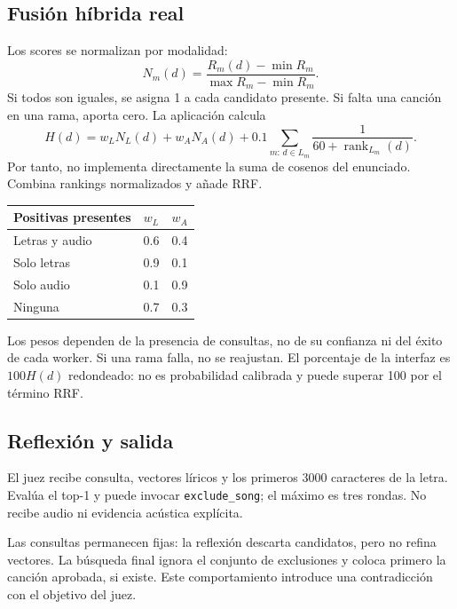 \documentclass[11pt,a4paper]{article}
\newcommand{\code}[1]{\nolinkurl{#1}}
\begin{document}
\subsection{Fusión híbrida real}
Los scores se normalizan por modalidad:
\[
N_m(d)=\frac{R_m(d)-\min R_m}{\max R_m-\min R_m}.
\]
Si todos son iguales, se asigna 1 a cada candidato presente. Si falta una canción en una rama, aporta cero. La aplicación calcula
\[
H(d)=w_LN_L(d)+w_AN_A(d)
+0.1\sum_{m:\,d\in L_m}\frac{1}{60+\operatorname{rank}_{L_m}(d)}.
\]
Por tanto, no implementa directamente la suma de cosenos del enunciado. Combina rankings normalizados y añade RRF.

\begin{center}
\begin{tabular}{lcc}
\toprule Positivas presentes & $w_L$ & $w_A$\\\midrule
Letras y audio & 0.6 & 0.4\\
Solo letras & 0.9 & 0.1\\
Solo audio & 0.1 & 0.9\\
Ninguna & 0.7 & 0.3\\\bottomrule
\end{tabular}
\end{center}
Los pesos dependen de la presencia de consultas, no de su confianza ni del éxito de cada worker. Si una rama falla, no se reajustan. El porcentaje de la interfaz es $100H(d)$ redondeado: no es probabilidad calibrada y puede superar 100 por el término RRF.

\subsection{Reflexión y salida}
El juez recibe consulta, vectores líricos y los primeros 3000 caracteres de la letra. Evalúa el top-1 y puede invocar \code{exclude_song}; el máximo es tres rondas. No recibe audio ni evidencia acústica explícita.

Las consultas permanecen fijas: la reflexión descarta candidatos, pero no refina vectores. La búsqueda final ignora el conjunto de exclusiones y coloca primero la canción aprobada, si existe. Este comportamiento introduce una contradicción con el objetivo del juez.
\end{document}
